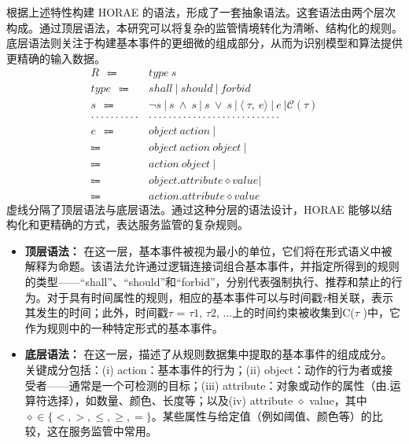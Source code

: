 根据上述特性构建 HORAE 的语法，形成了一套抽象语法\cite{cousot1995formal}。这套语法由两个层次构成。通过顶层语法，本研究可以将复杂的监管情境转化为清晰、结构化的规则。底层语法则关注于构建基本事件的更细微的组成部分，从而为识别模型和算法提供更精确的输入数据。
\begin{align*}
    R \ \  \Coloneqq \ \  & type~s \tag{typed rule}\\
    type \ \  \Coloneqq \ \  & shall~|~should~|~forbid \tag{predefined types}\\
    s \ \  \Coloneqq \ \  &  \neg s~|~s~ \land~ s ~|~s~ \lor~ s ~|~
    \langle~\tau,~e \rangle~|~e~|\mathcal{C}(\tau) \tag{statement}\\
    \cdot \cdot \cdot \cdot\cdot\cdot\cdot\cdot\cdot\cdot & \cdot\cdot\cdot\cdot\cdot\cdot\cdot\cdot\cdot\cdot\cdot\cdot\cdot\cdot\cdot\cdot\cdot\cdot \cdot \cdot \cdot \cdot \cdot \cdot \cdot \cdot\cdot\\
    e \ \  \Coloneqq \ \  & object~action~| \tag{patterned event}\\
    \Coloneqq \ \  & object~action~object~|\\
    \Coloneqq \ \  & action~object~|\\
    \Coloneqq \ \  & object. attribute \diamond value|\\
    \Coloneqq \ \  & action. attribute \diamond value
\end{align*}
虚线分隔了顶层语法与底层语法。通过这种分层的语法设计，HORAE 能够以结构化和更精确的方式，表达服务监管的复杂规则。



\begin{itemize}
    \item \textbf{顶层语法：} 在这一层，基本事件被视为最小的单位，它们将在形式语义中被解释为命题。该语法允许通过逻辑连接词组合基本事件，并指定所得到的规则的类型——“shall”、“should”和“forbid”，分别代表强制执行、推荐和禁止的行为。对于具有时间属性的规则，相应的基本事件可以与时间戳$\tau$相关联，表示其发生的时间；此外，时间戳$\tau$ = {$\tau1$, $\tau2$, ...}上的时间约束被收集到C($\tau$ )中，它作为规则中的一种特定形式的基本事件。
    \item \textbf{底层语法：} 在这一层，描述了从规则数据集中提取的基本事件的组成成分。关键成分包括：(i) action：基本事件的行为；(ii) object：动作的行为者或接受者——通常是一个可检测的目标；(iii) attribute：对象或动作的属性（由.运算符选择），如数量、颜色、长度等；以及(iv) attribute $\diamond$ value，其中$\diamond \in \{<, >, \leq, \geq, =\}$。某些属性与给定值（例如阈值、颜色等）的比较，这在服务监管中常用。
\end{itemize}

